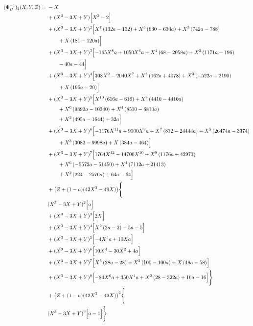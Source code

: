 \begin{align*}
(\Phi_H^{-1})_2(X,Y,Z)={}&- X\\
&{}+(X^3-3X+Y)\Bigl[X^{2} - 2\Bigr]\\
&{}+(X^3-3X+Y)^{2}\Bigl[X^{7} \left(132 a - 132\right) + X^{5} \left(630 - 630 a\right) + X^{3} \left(742 a - 788\right)\\
&\qquad + X \left(181 - 120 a\right)\Bigr]\\
&{}+(X^3-3X+Y)^{3}\Bigl[- 165 X^{8} a + 1050 X^{6} a + X^{4} \left(68 - 2058 a\right) + X^{2} \left(1171 a - 196\right)\\
&\qquad - 40 a - 44\Bigr]\\
&{}+(X^3-3X+Y)^{4}\Bigl[308 X^{9} - 2040 X^{7} + X^{5} \left(162 a + 4078\right) + X^{3} \left(- 522 a - 2190\right)\\
&\qquad + X \left(196 a - 20\right)\Bigr]\\
&{}+(X^3-3X+Y)^{5}\Bigl[X^{10} \left(616 a - 616\right) + X^{8} \left(4410 - 4410 a\right)\\
&\qquad + X^{6} \left(9892 a - 10340\right) + X^{4} \left(8510 - 6810 a\right)\\
&\qquad + X^{2} \left(495 a - 1644\right) + 32 a\Bigr]\\
&{}+(X^3-3X+Y)^{6}\Bigl[- 1176 X^{11} a + 9100 X^{9} a + X^{7} \left(812 - 24444 a\right) + X^{5} \left(26474 a - 3374\right)\\
&\qquad + X^{3} \left(3082 - 9998 a\right) + X \left(384 a - 464\right)\Bigr]\\
&{}+(X^3-3X+Y)^{7}\Bigl[1764 X^{12} - 14700 X^{10} + X^{8} \left(1176 a + 42973\right)\\
&\qquad + X^{6} \left(- 5572 a - 51450\right) + X^{4} \left(7112 a + 21413\right)\\
&\qquad + X^{2} \left(224 - 2576 a\right) + 64 a - 64\Bigr]\\
&{}+\bigl(Z+(1-a)(42X^3-49X)\bigr)\Biggl\{\\
&{}(X^3-3X+Y)^{2}\Bigl[a\Bigr]\\
&{}+(X^3-3X+Y)^{3}\Bigl[2 X\Bigr]\\
&{}+(X^3-3X+Y)^{4}\Bigl[X^{2} \left(2 a - 2\right) - 5 a - 5\Bigr]\\
&{}+(X^3-3X+Y)^{5}\Bigl[- 4 X^{3} a + 10 X a\Bigr]\\
&{}+(X^3-3X+Y)^{6}\Bigl[10 X^{4} - 30 X^{2} + 4 a\Bigr]\\
&{}+(X^3-3X+Y)^{7}\Bigl[X^{5} \left(28 a - 28\right) + X^{3} \left(100 - 100 a\right) + X \left(48 a - 58\right)\Bigr]\\
&{}+(X^3-3X+Y)^{8}\Bigl[- 84 X^{6} a + 350 X^{4} a + X^{2} \left(28 - 322 a\right) + 16 a - 16\Bigr]\Biggr\}\\
&{}+\bigl(Z+(1-a)(42X^3-49X)\bigr)^{2}\Biggl\{\\
&{}(X^3-3X+Y)^{9}\Bigl[a - 1\Bigr]\Biggr\}
\end{align*}

